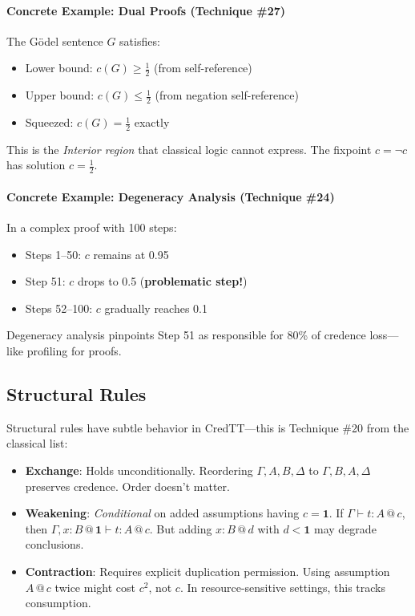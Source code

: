 \documentclass[11pt,a4paper]{article}
\makeatletter
\newcommand{\at}[1]{\,@\,#1}
\newcommand{\one}{\mathbf{1}}
\newcommand{\negc}{\neg}
\makeatother
\begin{document}
\paragraph{Concrete Example: Dual Proofs (Technique \#27)}
The G\"odel sentence $G$ satisfies:
\begin{itemize}
    \item Lower bound: $c(G) \geq \tfrac{1}{2}$ (from self-reference)
    \item Upper bound: $c(G) \leq \tfrac{1}{2}$ (from negation self-reference)
    \item Squeezed: $c(G) = \tfrac{1}{2}$ exactly
\end{itemize}
This is the \emph{Interior region} that classical logic cannot express. The fixpoint $c = \negc c$ has solution $c = \tfrac{1}{2}$.

\paragraph{Concrete Example: Degeneracy Analysis (Technique \#24)}
In a complex proof with 100 steps:
\begin{itemize}
    \item Steps 1--50: $c$ remains at 0.95
    \item Step 51: $c$ drops to 0.5 (\textbf{problematic step!})
    \item Steps 52--100: $c$ gradually reaches 0.1
\end{itemize}
Degeneracy analysis pinpoints Step 51 as responsible for 80\% of credence loss---like profiling for proofs.

\subsection{Structural Rules}
\label{sec:structural-credtt}

Structural rules have subtle behavior in CredTT---this is Technique \#20 from the classical list:

\begin{itemize}
    \item \textbf{Exchange}: Holds unconditionally. Reordering $\Gamma, A, B, \Delta$ to $\Gamma, B, A, \Delta$ preserves credence. Order doesn't matter.

    \item \textbf{Weakening}: \emph{Conditional} on added assumptions having $c = \one$. If $\Gamma \vdash t : A \at{c}$, then $\Gamma, x:B \at{\one} \vdash t : A \at{c}$. But adding $x:B \at{d}$ with $d < \one$ may degrade conclusions.

    \item \textbf{Contraction}: Requires explicit duplication permission. Using assumption $A \at{c}$ twice might cost $c^2$, not $c$. In resource-sensitive settings, this tracks consumption.
\end{itemize}
\end{document}
